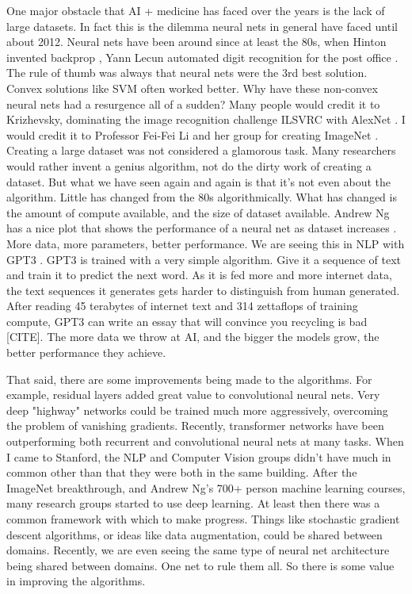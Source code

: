 One major obstacle that AI + medicine has faced over the years is the lack of large datasets.  In fact this is the dilemma neural nets in general have faced until about 2012.  Neural nets have been around since at least the 80s, when Hinton invented backprop \cite{rumelhart1986learning}, Yann Lecun automated digit recognition for the post office \cite{lecun1989backpropagation}.  The rule of thumb was always that neural nets were the 3rd best solution.  Convex solutions like SVM often worked better.  Why have these non-convex neural nets had a resurgence all of a sudden?  Many people would credit it to Krizhevsky, dominating the image recognition challenge ILSVRC with AlexNet \cite{krizhevsky2012imagenet}.  I would credit it to Professor Fei-Fei Li and her group for creating ImageNet \cite{deng2009imagenet}.  Creating a large dataset was not considered a glamorous task.  Many researchers would rather invent a genius algorithm, not do the dirty work of creating a dataset.  But what we have seen again and again is that it's not even about the algorithm.  Little has changed from the 80s algorithmically.  What has changed is the amount of compute available, and the size of dataset available.  Andrew Ng has a nice plot that shows the performance of a neural net as dataset increases \cite{ng2016nuts}.  More data, more parameters, better performance.  We are seeing this in NLP with GPT3 \cite{brown2020language}.  GPT3 is trained with a very simple algorithm.  Give it a sequence of text and train it to predict the next word.  As it is fed more and more internet data, the text sequences it generates gets harder to distinguish from human generated.  After reading 45 terabytes of internet text and 314 zettaflops of training compute, GPT3 can write an essay that will convince you recycling is bad [CITE].  The more data we throw at AI, and the bigger the models grow, the better performance they achieve.

That said, there are some improvements being made to the algorithms.  For example, residual layers added great value to convolutional neural nets.  Very deep "highway" networks could be trained much more aggressively, overcoming the problem of vanishing gradients.  Recently, transformer networks have been outperforming both recurrent and convolutional neural nets at many tasks.  When I came to Stanford, the NLP and Computer Vision groups didn't have much in common other than that they were both in the same building.  After the ImageNet breakthrough, and Andrew Ng's 700+ person machine learning courses, many research groups started to use deep learning.  At least then there was a common framework with which to make progress.  Things like stochastic gradient descent algorithms, or ideas like data augmentation, could be shared between domains.  Recently, we are even seeing the same type of neural net architecture being shared between domains.  One net to rule them all.  So there is some value in improving the algorithms.  

